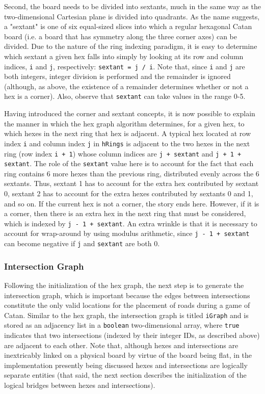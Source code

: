\documentclass[pageno]{jpaper}
\begin{document}
\begin{doublespacing}
Second, the board needs to be divided into sextants, much in the same way as the two-dimensional Cartesian plane is divided into quadrants. As the name suggests, a "sextant" is one of six equal-sized slices into which a regular hexagonal Catan board (i.e. a board that has symmetry along the three corner axes) can be divided. Due to the nature of the ring indexing paradigm, it is easy to determine which sextant a given hex falls into simply by looking at its row and column indices, \lstinline$i$ and \lstinline$j$, respectively: \lstinline$sextant = j / i$. Note that, since \lstinline$i$ and \lstinline$j$ are both integers, integer division is performed and the remainder is ignored (although, as above, the existence of a remainder determines whether or not a hex is a corner). Also, observe that \lstinline$sextant$ can take values in the range 0-5.

Having introduced the corner and sextant concepts, it is now possible to explain the manner in which the hex graph algorithm determines, for a given hex, to which hexes in the next ring that hex is adjacent. A typical hex located at row index \lstinline$i$ and column index \lstinline$j$ in \lstinline$hRings$ is adjacent to the two hexes in the next ring (row index \lstinline$i + 1$) whose column indices are \lstinline$j + sextant$ and \lstinline$j + 1 + sextant$. The role of the \lstinline$sextant$ value here is to account for the fact that each ring contains 6 more hexes than the previous ring, distributed evenly across the 6 sextants. Thus, sextant 1 has to account for the extra hex contributed by sextant 0, sextant 2 has to account for the extra hexes contributed by sextants 0 and 1, and so on. If the current hex is not a corner, the story ends here. However, if it is a corner, then there is an extra hex in the next ring that must be considered, which is indexed by \lstinline$j - 1 + sextant$. An extra wrinkle is that it is necessary to account for wrap-around by using modulus arithmetic, since \lstinline$j - 1 + sextant$ can become negative if \lstinline$j$ and \lstinline$sextant$ are both 0.

\hypertarget{sec:intersection_graph}{}
\subsubsection{Intersection Graph}

Following the initialization of the hex graph, the next step is to generate the intersection graph, which is important because the edges between intersections constitute the only valid locations for the placement of roads during a game of Catan. Similar to the hex graph, the intersection graph is titled \lstinline$iGraph$ and is stored as an adjacency list in a \lstinline$boolean$ two-dimensional array, where \lstinline$true$ indicates that two intersections (indexed by their integer IDs, as described above) are adjacent to each other. Note that, although hexes and intersections are inextricably linked on a physical board by virtue of the board being flat, in the implementation presently being discussed hexes and intersections are logically separate entities (that said, the next section describes the initialization of the logical bridges between hexes and intersections).


\end{doublespacing}
\end{document}
